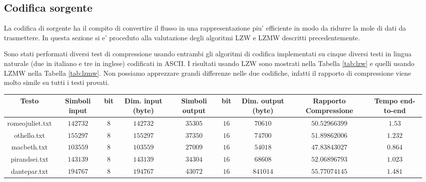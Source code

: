 \documentclass[a4paper,11pt]{article}
\theoremstyle{definition}
\begin{document}
\subsection{Codifica sorgente}
La codifica di sorgente ha il compito di convertire il flusso in una rappresentazione piu' efficiente in modo da ridurre la mole di dati da trasmettere. In questa sezione si e' proceduto alla valutazione degli algoritmi LZW e LZMW descritti precedentemente.

Sono stati performati diversi test di compressione usando entrambi gli algoritmi di codifica implementati su cinque diversi testi in lingua naturale (due in italiano e tre in inglese) codificati in ASCII. I risultati usando LZW sono mostrati nella Tabella \ref{tab:lzw} e quelli usando LZMW nella Tabella \ref{tab:lzmw}. Non possiamo apprezzare grandi differenze nelle due codifiche, infatti il rapporto di compressione viene molto simile su tutti i testi provati.

\begin{sidewaystable}
	\scriptsize
	\begin{tabular}{|c|c|c|c|c|c|c|c|c|}
		\hline
		\textbf{Testo}  &  \textbf{Simboli input} &  \textbf{bit} &   \textbf{Dim. input (byte)} & \textbf{Simboli output} & \textbf{bit} &  \textbf{Dim. output (byte)} &  \textbf{Rapporto Compressione} & \textbf{Tempo end-to-end} \\
		
		\hline romeojuliet.txt & $142732$ & $8$ & $142732$ & $35305$ & $16$	& $70610$ & $50.52966399$ & $1.53$ \\
		
		\hline othello.txt & $155297$ & $8$ & $155297$ & $37350$ & $16$	& $74700$ & $51.89862006$ & $1.232$ \\
		
		\hline macbeth.txt & $103559$ & $8$ & $103559$ & $27009$ & $16$	& $54018$ & $47.83843027$ & $0.864$ \\
		
		\hline pirandsei.txt & $143139$ & $8$ & $143139$ & $34304$ & $16$	& $68608$ & $52.06896793$ & $1.023$ \\
		
		\hline dantepar.txt & $194767$ & $8$ & $194767$ & $43072$ & $16$	& $841014$ & $55.77074145$ & $1.481$ \\
		
		\hline		
	\end{tabular}
	\caption{Codifica di testi in lingua inglese e italiana con metodo di compressione LZW e codifica di canale a ripetizione (fattore ripetizione 5) con modello di errore isolato (modello di canale simmetrico binario $\alpha=10^-5$).}
	\label{tab:lzw}

\end{sidewaystable}
\end{document}
